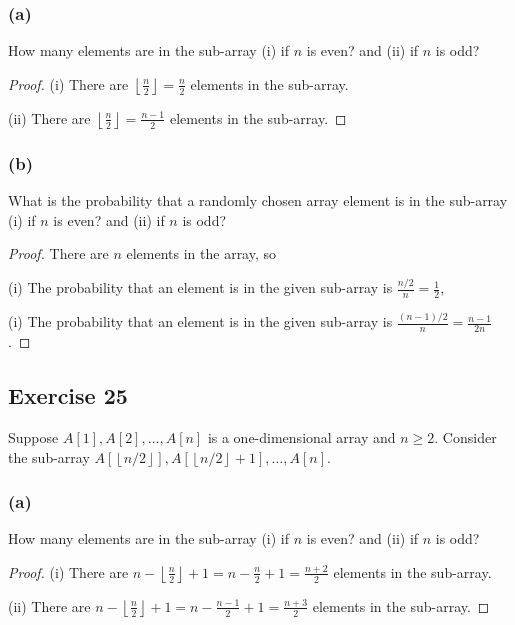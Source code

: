 \documentclass[14pt]{extarticle}
\newcommand{\floor}[1]{{\left\lfloor#1\right\rfloor}}
\begin{document}
\subsubsection{(a)}
How many elements are in the sub-array (i) if $n$ is even? and (ii) if $n$ is odd?

\begin{proof}
     (i) There are \(\floor{\frac{n}{2}} = \frac{n}{2}\) elements in the sub-array.

     (ii) There are \(\floor{\frac{n}{2}} = \frac{n-1}{2}\) elements in the sub-array.
\end{proof}

\subsubsection{(b)}
What is the probability that a randomly chosen array element is in the sub-array (i) if $n$ is even? and
(ii) if $n$ is odd?

\begin{proof}
     There are $n$ elements in the array, so

     (i) The probability that an element is in the given sub-array is \(\frac{n/2}{n} = \frac{1}{2}\),

     (i) The probability that an element is in the given sub-array is \(\frac{(n-1)/2}{n} = \frac{n-1}{2n}\).
\end{proof}

\subsection{Exercise 25}
Suppose \(A[1], A[2], \ldots, A[n]\) is a one-dimensional array and \(n \geq 2\). Consider the sub-array
\(A[\floor{n/2}], A[\floor{n/2}+1], \ldots, A[n]\).

\subsubsection{(a)}
How many elements are in the sub-array (i) if $n$ is even? and (ii) if $n$ is odd?

\begin{proof}
     (i) There are \(n - \floor{\frac{n}{2}} + 1 = n - \frac{n}{2} + 1 = \frac{n+2}{2}\) elements in the sub-array.

     (ii) There are \(n-\floor{\frac{n}{2}}+1 = n-\frac{n-1}{2} + 1 = \frac{n+3}{2}\) elements in the sub-array.
\end{proof}
\end{document}
